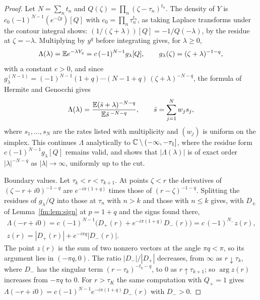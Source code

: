 \begin{proof}
Let $N=\sum_nt_n$ and $Q(\zeta)=\prod_n(\zeta-\tau_n)^{t_n}$. The density of $Y$ is $c_0(-1)^{N-1}(e^{-\zeta y})[Q]$ with $c_0=\prod_n\tau_n^{t_n}$, as taking Laplace transforms under the contour integral shows: $(1/(\zeta+\lambda))[Q]=-1/Q(-\lambda)$, by the residue at $\zeta=-\lambda$. Multiplying by $y^q$ before integrating gives, for $\lambda\ge0$,
\[
\Lambda(\lambda)=\mathbb{E} e^{-\lambda Y_q}=c\,(-1)^{N-1}g_\lambda[Q],\qquad g_\lambda(\zeta)=(\zeta+\lambda)^{-1-q},
\]
with a constant $c>0$, and since $g_\lambda^{(N-1)}=(-1)^{N-1}(1+q)\cdots(N-1+q)\,(\zeta+\lambda)^{-N-q}$, the formula of Hermite and Genocchi gives
\[
\Lambda(\lambda)=\frac{\mathbb{E}(\bar s+\lambda)^{-N-q}}{\mathbb{E}\bar s^{\,-N-q}},\qquad\bar s=\sum_{j=1}^Nw_js_j ,
\]
where $s_1,\dots,s_N$ are the rates listed with multiplicity and $(w_j)$ is uniform on the simplex. This continues $\Lambda$ analytically to $\mathbb{C}\setminus(-\infty,-\tau_1]$, where the residue form $c(-1)^{N-1}g_\lambda[Q]$ remains valid, and shows that $|\Lambda(\lambda)|$ is of exact order $|\lambda|^{-N-q}$ as $|\lambda|\to\infty$, uniformly up to the cut.

Boundary values. Let $\tau_k<r<\tau_{k+1}$. At points $\zeta<r$ the derivatives of $(\zeta-r+i0)^{-1-q}$ are $e^{-i\pi(1+q)}$ times those of $(r-\zeta)^{-1-q}$. Splitting the residues of $g_\lambda/Q$ into those at $\tau_n$ with $n>k$ and those with $n\le k$ gives, with $D_\pm$ of Lemma~\ref{fm:lem:sign} at $p=1+q$ and the signs found there,
\begin{gather*}
\Lambda(-r+i0)=c\,(-1)^{N-1}\big(D_+(r)+e^{-i\pi(1+q)}D_-(r)\big)=c\,(-1)^{N_-}z(r),\\
z(r)=|D_+(r)|+e^{-i\pi q}|D_-(r)| .
\end{gather*}
The point $z(r)$ is the sum of two nonzero vectors at the angle $\pi q<\pi$, so its argument lies in $(-\pi q,0)$. The ratio $|D_-|/|D_+|$ decreases, from $\infty$ as $r\downarrow\tau_k$, where $D_-$ has the singular term $(r-\tau_k)^{-t_k-q}$, to $0$ as $r\uparrow\tau_{k+1}$; so $\arg z(r)$ increases from $-\pi q$ to $0$. For $r>\tau_K$ the same computation with $Q_+=1$ gives $\Lambda(-r+i0)=c(-1)^{N-1}e^{-i\pi(1+q)}D_-(r)$ with $D_->0$.


\end{proof}
